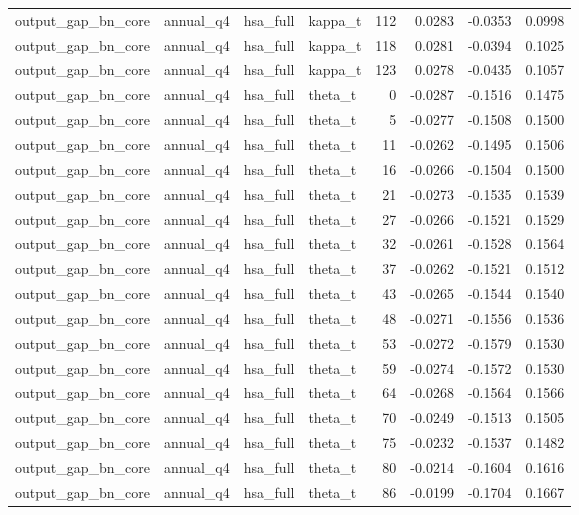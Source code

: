\begin{tabular}{llllrrrr}
output\_gap\_bn\_core & annual\_q4 & hsa\_full & kappa\_t & 112 & 0.0283 & -0.0353 & 0.0998 \\
output\_gap\_bn\_core & annual\_q4 & hsa\_full & kappa\_t & 118 & 0.0281 & -0.0394 & 0.1025 \\
output\_gap\_bn\_core & annual\_q4 & hsa\_full & kappa\_t & 123 & 0.0278 & -0.0435 & 0.1057 \\
output\_gap\_bn\_core & annual\_q4 & hsa\_full & theta\_t & 0 & -0.0287 & -0.1516 & 0.1475 \\
output\_gap\_bn\_core & annual\_q4 & hsa\_full & theta\_t & 5 & -0.0277 & -0.1508 & 0.1500 \\
output\_gap\_bn\_core & annual\_q4 & hsa\_full & theta\_t & 11 & -0.0262 & -0.1495 & 0.1506 \\
output\_gap\_bn\_core & annual\_q4 & hsa\_full & theta\_t & 16 & -0.0266 & -0.1504 & 0.1500 \\
output\_gap\_bn\_core & annual\_q4 & hsa\_full & theta\_t & 21 & -0.0273 & -0.1535 & 0.1539 \\
output\_gap\_bn\_core & annual\_q4 & hsa\_full & theta\_t & 27 & -0.0266 & -0.1521 & 0.1529 \\
output\_gap\_bn\_core & annual\_q4 & hsa\_full & theta\_t & 32 & -0.0261 & -0.1528 & 0.1564 \\
output\_gap\_bn\_core & annual\_q4 & hsa\_full & theta\_t & 37 & -0.0262 & -0.1521 & 0.1512 \\
output\_gap\_bn\_core & annual\_q4 & hsa\_full & theta\_t & 43 & -0.0265 & -0.1544 & 0.1540 \\
output\_gap\_bn\_core & annual\_q4 & hsa\_full & theta\_t & 48 & -0.0271 & -0.1556 & 0.1536 \\
output\_gap\_bn\_core & annual\_q4 & hsa\_full & theta\_t & 53 & -0.0272 & -0.1579 & 0.1530 \\
output\_gap\_bn\_core & annual\_q4 & hsa\_full & theta\_t & 59 & -0.0274 & -0.1572 & 0.1530 \\
output\_gap\_bn\_core & annual\_q4 & hsa\_full & theta\_t & 64 & -0.0268 & -0.1564 & 0.1566 \\
output\_gap\_bn\_core & annual\_q4 & hsa\_full & theta\_t & 70 & -0.0249 & -0.1513 & 0.1505 \\
output\_gap\_bn\_core & annual\_q4 & hsa\_full & theta\_t & 75 & -0.0232 & -0.1537 & 0.1482 \\
output\_gap\_bn\_core & annual\_q4 & hsa\_full & theta\_t & 80 & -0.0214 & -0.1604 & 0.1616 \\
output\_gap\_bn\_core & annual\_q4 & hsa\_full & theta\_t & 86 & -0.0199 & -0.1704 & 0.1667 \\

\end{tabular}
